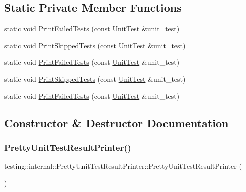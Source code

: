 \subsection*{Static Private Member Functions}
\begin{DoxyCompactItemize}
\item 
static void \mbox{\hyperlink{classtesting_1_1internal_1_1_pretty_unit_test_result_printer_aca5a9dc08998948e293b307d931b3f86}{Print\+Failed\+Tests}} (const \mbox{\hyperlink{classtesting_1_1_unit_test}{Unit\+Test}} \&unit\+\_\+test)
\item 
static void \mbox{\hyperlink{classtesting_1_1internal_1_1_pretty_unit_test_result_printer_a2916db1a4f24dd9d07a7ec490a8a9ace}{Print\+Skipped\+Tests}} (const \mbox{\hyperlink{classtesting_1_1_unit_test}{Unit\+Test}} \&unit\+\_\+test)
\item 
static void \mbox{\hyperlink{classtesting_1_1internal_1_1_pretty_unit_test_result_printer_aebb8c57362544a84166239fe0a6610bd}{Print\+Failed\+Tests}} (const \mbox{\hyperlink{classtesting_1_1_unit_test}{Unit\+Test}} \&unit\+\_\+test)
\item 
static void \mbox{\hyperlink{classtesting_1_1internal_1_1_pretty_unit_test_result_printer_af9963eedd9a017d30c28d20f44dbf2f9}{Print\+Skipped\+Tests}} (const \mbox{\hyperlink{classtesting_1_1_unit_test}{Unit\+Test}} \&unit\+\_\+test)
\item 
static void \mbox{\hyperlink{classtesting_1_1internal_1_1_pretty_unit_test_result_printer_aebb8c57362544a84166239fe0a6610bd}{Print\+Failed\+Tests}} (const \mbox{\hyperlink{classtesting_1_1_unit_test}{Unit\+Test}} \&unit\+\_\+test)
\end{DoxyCompactItemize}


\subsection{Constructor \& Destructor Documentation}
\mbox{\label{classtesting_1_1internal_1_1_pretty_unit_test_result_printer_a9219a4263ef0057c98a2a2a41f35ee15}} 
\subsubsection{\texorpdfstring{PrettyUnitTestResultPrinter()}{PrettyUnitTestResultPrinter()}\hspace{0.1cm}{\footnotesize\ttfamily [1/3]}}
{\footnotesize\ttfamily testing\+::internal\+::\+Pretty\+Unit\+Test\+Result\+Printer\+::\+Pretty\+Unit\+Test\+Result\+Printer (\begin{DoxyParamCaption}{ }\end{DoxyParamCaption})\hspace{0.3cm}{\ttfamily [inline]}}

